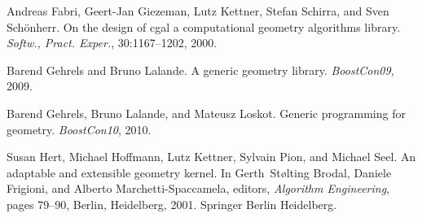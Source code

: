 
\begin{DoxyDescription}
\item[\label{citelist_CITEREF_Fabri2000OnTD}%
\Hypertarget{citelist_CITEREF_Fabri2000OnTD}%
\mbox{[}1\mbox{]}]Andreas Fabri, Geert-\/\+Jan Giezeman, Lutz Kettner, Stefan Schirra, and Sven Sch\"{o}nherr. On the design of cgal a computational geometry algorithms library. {\itshape Softw., Pract. Exper.}, 30\+:1167--1202, 2000.


\item[\label{citelist_CITEREF_BB2009}%
\Hypertarget{citelist_CITEREF_BB2009}%
\mbox{[}2\mbox{]}]Barend Gehrels and Bruno Lalande. A generic geometry library. {\itshape Boost\+Con\textquotesingle{}09}, 2009.


\item[\label{citelist_CITEREF_BBM2010}%
\Hypertarget{citelist_CITEREF_BBM2010}%
\mbox{[}3\mbox{]}]Barend Gehrels, Bruno Lalande, and Mateusz Loskot. Generic programming for geometry. {\itshape Boost\+Con\textquotesingle{}10}, 2010.


\item[\label{citelist_CITEREF_HHKPS01}%
\Hypertarget{citelist_CITEREF_HHKPS01}%
\mbox{[}4\mbox{]}]Susan Hert, Michael Hoffmann, Lutz Kettner, Sylvain Pion, and Michael Seel. An adaptable and extensible geometry kernel. In Gerth~St{\o}lting Brodal, Daniele Frigioni, and Alberto Marchetti-\/\+Spaccamela, editors, {\itshape Algorithm Engineering}, pages 79--90, Berlin, Heidelberg, 2001. Springer Berlin Heidelberg. 


\end{DoxyDescription}